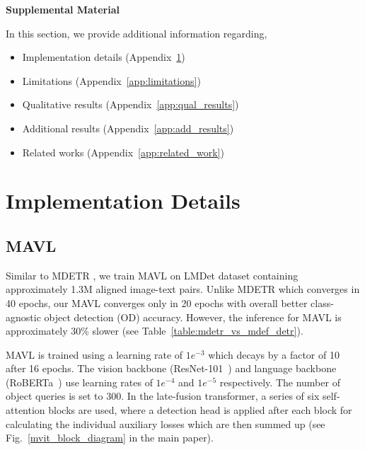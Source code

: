 \documentclass[runningheads]{llncs}
\begin{document}
\appendix
\begin{center}
\textbf{\Large Supplemental Material}
\end{center}

In this section, we provide additional information regarding,
\begin{itemize}
\item Implementation details (Appendix~\ref{app:imp_detail})
    \item Limitations (Appendix~\ref{app:limitations})
    \item Qualitative results (Appendix~\ref{app:qual_results})
    \item Additional results (Appendix~\ref{app:add_results})
    \item Related works (Appendix~\ref{app:related_work})
\end{itemize}

\section{Implementation Details}\label{app:imp_detail}
\subsection{MAVL}\label{app:imp_detail_mdef}
Similar to MDETR \cite{mdetr}, we train MAVL on LMDet dataset containing approximately 1.3M aligned image-text pairs. Unlike MDETR which converges in 40 epochs, our MAVL converges only in 20 epochs with overall better class-agnostic object detection (OD) accuracy. However, the inference for MAVL is approximately 30\% slower (see Table~\ref{table:mdetr_vs_mdef_detr}).

MAVL is trained using a learning rate of $1e^{-3}$ which decays by a factor of 10 after 16 epochs. The vision backbone (ResNet-101~\cite{he2016deep}) and language backbone (RoBERTa~\cite{roberta}) use learning rates of $1e^{-4}$ and $1e^{-5}$ respectively. The number of object queries is set to 300. In the late-fusion transformer, a series of six self-attention blocks are used, where a detection head is applied after each block for calculating the individual auxiliary losses which are then summed up (see Fig.~\ref{mvit_block_diagram} in the main paper).
\end{document}
